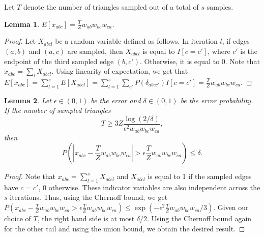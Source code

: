 \documentclass{article}
\newtheorem{lemma}{Lemma}
\begin{document}
Let $T$ denote the number of triangles sampled
out of a total of $s$ samples.
\begin{lemma}\label{lemma:expectation}
$E[x_{abc}] = \frac{T}{Z} w_{ab}w_{bc}w_{ca}$.
\end{lemma}
\begin{proof}
Let $X_{abcl}$ be a random variable defined as follows. In
iteration $l$, if edges $(a,b)$ and $(a,c)$ are sampled,
then $X_{abcl}$ is equal to $I[c=c']$, where $c'$ is the 
endpoint of the third sampled edge $(b,c')$. Otherwise, it 
is equal to 0. Note that $x_{abc} = \sum\limits_{l} 
X_{abcl}$. Using linearity of expectation, we get that
$E[x_{abc}] = \sum\limits_{l=1}^s E[X_{abcl}] = \sum\limits_{l=1}^s \sum\limits_{c'} P(\delta_{abcc'})I[c=c'] =\frac{T}{Z} w_{ab} w_{bc} w_{ca} $.
\end{proof}

\begin{lemma}\label{lemma:concentration}
Let $\epsilon \in (0,1)$ be the error and $\delta \in (0,1)$ be
the error probability.
If the number of sampled triangles
\begin{equation*}
  T \geq 3 Z \frac{\log{(2/\delta)}}{\epsilon^2 w_{ab} w_{bc} w_{ca}},
\end{equation*}
then
\begin{equation*}
  P(|x_{abc} - \frac{T}{Z}w_{ab} w_{bc} w_{ca} | > \epsilon \frac{T}{Z}w_{ab} w_{bc} w_{ca}) \leq \delta.
\end{equation*}
\end{lemma}
\begin{proof}
Note that $x_{abc} = \sum\limits_{l=1}^{s} X_{abcl}$ and
$X_{abcl}$ is equal to 1 if the sampled edges have 
$c = c'$, 0 otherwise. These indicator variables are also
independent across the $s$ iterations. Thus, using the
Chernoff bound, we get $P(x_{abc} - \frac{T}{Z}w_{ab}w_{bc}w_{ca} > \epsilon \frac{T}{Z}w_{ab}w_{bc}w_{ca}) \leq \exp{(-\epsilon^2 \frac{T}{Z}w_{ab}w_{bc}w_{ca}/3)}$.
Given our choice of $T$, the right hand side is at most 
$\delta/2$. Using the Chernoff bound again for the other 
tail and using the union bound, we obtain the desired result.
\end{proof}
\end{document}
